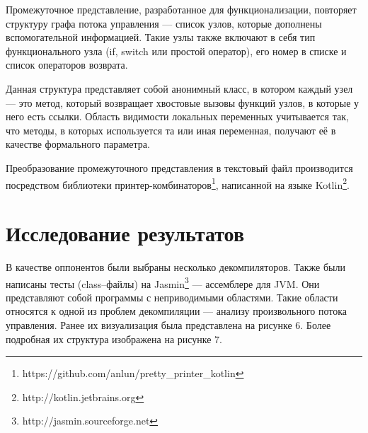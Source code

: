 Промежуточное представление, разработанное для функционализации, повторяет структуру графа потока управления --- список узлов, которые дополнены вспомогательной информацией. Такие узлы также включают в себя тип функционального узла (if, switch или простой оператор), его номер в списке и список операторов возврата. 

Данная структура представляет собой анонимный класс, в котором каждый узел --- это метод, который возвращает хвостовые вызовы функций узлов, в которые у него есть ссылки. Область видимости локальных переменных учитывается так, что методы, в которых используется та или иная переменная, получают её в качестве формального параметра. 

Преобразование промежуточного представления в текстовый файл производится посредством библиотеки принтер-комбинаторов\footnote{https://github.com/anlun/pretty\_printer\_kotlin}, написанной на языке Kotlin\footnote{http://kotlin.jetbrains.org}.

\section{Исследование результатов}

В качестве оппонентов были выбраны несколько декомпиляторов. Также были написаны тесты (class--файлы) на Jasmin\footnote{http://jasmin.sourceforge.net} --- ассемблере для JVM. Они представляют собой программы с неприводимыми областями. Такие области относятся к одной из проблем декомпиляции --- анализу произвольного потока управления. Ранее их визуализация была представлена на рисунке 6. Более подробная их структура изображена на рисунке 7.

